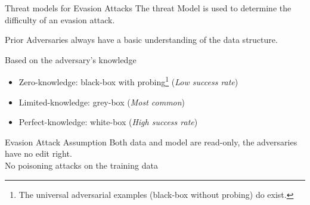 \documentclass[9pt]{beamer}
\begin{document}
\begin{frame}{Threat models for Evasion Attacks}
The threat Model is used to determine the difficulty of an evasion attack.

\begin{block}{Prior}
Adversaries always have a basic understanding of the data structure.
\end{block}

Based on the adversary's knowledge

\begin{itemize}
    \item Zero-knowledge: black-box with probing\footnote{The universal adversarial examples (black-box without probing) do exist.} (\textit{Low success rate})
    \item Limited-knowledge: grey-box (\textit{Most common})
    \item Perfect-knowledge: white-box (\textit{High success rate})
\end{itemize}

\begin{alertblock}{Evasion Attack Assumption}
Both data and model are read-only, the adversaries have no edit right.\\
No poisoning attacks on the training data
\end{alertblock}
\end{frame}
\end{document}
